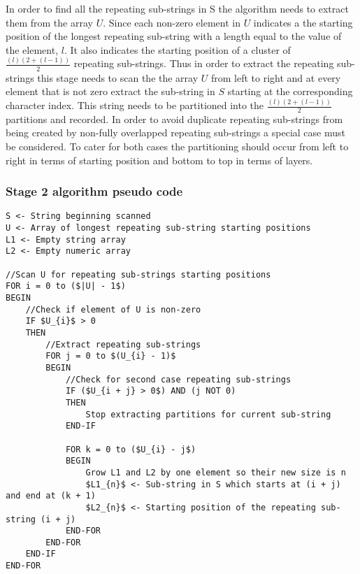\documentclass[12pt]{article}
\begin{document}
\begin{flushleft}
	In order to find all the repeating sub-strings in S the algorithm needs to extract them from the array $U$. Since each non-zero element in $U$ indicates a the starting position of the longest repeating sub-string with a length equal to the value of the element, $l$. It also indicates the starting position of a cluster of $\frac{(l)(2 + (l-1))}{2}$ repeating sub-strings. Thus in order to extract the repeating sub-strings this stage needs to scan the the array $U$ from left to right and at every element that is not zero extract the sub-string in $S$ starting at the corresponding character index. This string needs to be partitioned into the $\frac{(l)(2 + (l-1))}{2}$ partitions and recorded. In order to avoid duplicate repeating sub-strings from being created by non-fully overlapped repeating sub-strings a special case must be considered. To cater for both cases the partitioning should occur from left to right in terms of starting position and bottom to top in terms of layers.
	\newpage
	\subsubsection{Stage 2 algorithm pseudo code}

\begin{lstlisting}
S <- String beginning scanned
U <- Array of longest repeating sub-string starting positions
L1 <- Empty string array
L2 <- Empty numeric array

//Scan U for repeating sub-strings starting positions 
FOR i = 0 to ($|U| - 1$)  
BEGIN			                
	//Check if element of U is non-zero
	IF $U_{i}$ > 0 
	THEN
		//Extract repeating sub-strings
		FOR j = 0 to $(U_{i} - 1)$ 
		BEGIN                  
			//Check for second case repeating sub-strings
			IF ($U_{i + j} > 0$) AND (j NOT 0) 
			THEN
				Stop extracting partitions for current sub-string
			END-IF
			
			FOR k = 0 to ($U_{i} - j$)
			BEGIN                               
				Grow L1 and L2 by one element so their new size is n
				$L1_{n}$ <- Sub-string in S which starts at (i + j) and end at (k + 1)
				$L2_{n}$ <- Starting position of the repeating sub-string (i + j)
			END-FOR
		END-FOR
	END-IF	
END-FOR		
\end{lstlisting}
		
		
\end{flushleft}
\end{document}
